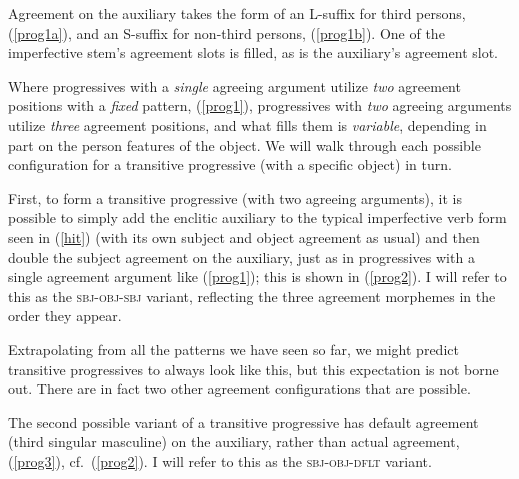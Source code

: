 \documentclass[output=paper
,modfonts
,nonflat]{langsci/langscibook}
\begin{document}
\noindent Agreement on the auxiliary takes the form of an L-suffix for third persons, (\ref{prog1a}), and an S-suffix for non-third persons, (\ref{prog1b}). One of the imperfective stem's agreement slots is filled, as is the auxiliary's agreement slot.

Where progressives with a \textit{single} agreeing argument utilize \textit{two} agreement positions with a \textit{fixed} pattern, (\ref{prog1}), progressives with \textit{two} agreeing arguments utilize \emph{three} agreement positions, and what fills them is \emph{variable}, depending in part on the person features of the object. We will walk through each possible configuration for a transitive progressive (with a specific object) in turn. 

First, to form a transitive progressive (with two agreeing arguments), it is possible to simply add the enclitic auxiliary to the typical imperfective verb form seen in  (\ref{hit}) (with its own subject and object agreement as usual) and then double the subject agreement on the auxiliary, just as in progressives with a single agreement argument like (\ref{prog1}); this is shown in (\ref{prog2}). I will refer to this as the \textsc{sbj-obj-sbj} variant, reflecting the three agreement morphemes in the order they appear.

\eal \label{prog2}
\zl

\noindent Extrapolating from all the patterns we have seen so far, we might predict transitive progressives to always look like this, but this expectation is not borne out. There are in fact two other agreement configurations that are possible.

The second possible variant of a transitive progressive has default agreement (third singular masculine) on the auxiliary, rather than actual agreement, (\ref{prog3}), cf.~(\ref{prog2}). I will refer to this as the \textsc{sbj-obj-dflt} variant.

\eal \label{prog3}
\zl
\end{document}
